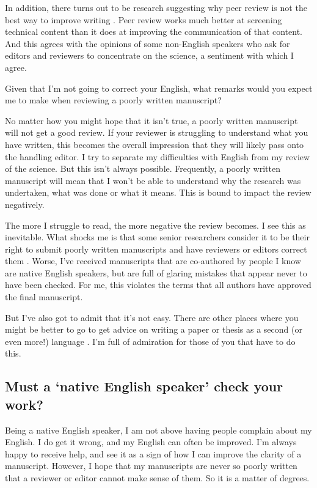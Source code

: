 \documentclass[
]{krantz}
\begin{document}
In addition, there turns out to be research suggesting why peer review is not the best way to improve writing \citep{shashok2008content}. Peer review works much better at screening technical content than it does at improving the communication of that content. And this agrees with the opinions of some non-English speakers who ask for editors and reviewers to concentrate on the science, a sentiment with which I agree.

Given that I'm not going to correct your English, what remarks would you expect me to make when reviewing a poorly written manuscript?

No matter how you might hope that it isn't true, a poorly written manuscript will not get a good review. If your reviewer is struggling to understand what you have written, this becomes the overall impression that they will likely pass onto the handling editor. I try to separate my difficulties with English from my review of the science. But this isn't always possible. Frequently, a poorly written manuscript will mean that I won't be able to understand why the research was undertaken, what was done or what it means. This is bound to impact the review negatively.

The more I struggle to read, the more negative the review becomes. I see this as inevitable. What shocks me is that some senior researchers consider it to be their right to submit poorly written manuscripts and have reviewers or editors correct them \citep[if you don't believe me, see][]{statzner2010negative}. Worse, I've received manuscripts that are co-authored by people I know are native English speakers, but are full of glaring mistakes that appear never to have been checked. For me, this violates the terms that all authors have approved the final manuscript.

But I've also got to admit that it's not easy. There are other places where you might be better to go to get advice on writing a paper or thesis as a second (or even more!) language \citep[see][]{firth2017writing}. I'm full of admiration for those of you that have to do this.

\hypertarget{must-a-native-english-speaker-check-your-work}{%
\subsection{Must a `native English speaker' check your work?}\label{must-a-native-english-speaker-check-your-work}}

Being a native English speaker, I am not above having people complain about my English. I do get it wrong, and my English can often be improved. I'm always happy to receive help, and see it as a sign of how I can improve the clarity of a manuscript. However, I hope that my manuscripts are never so poorly written that a reviewer or editor cannot make sense of them. So it is a matter of degrees.
\end{document}
